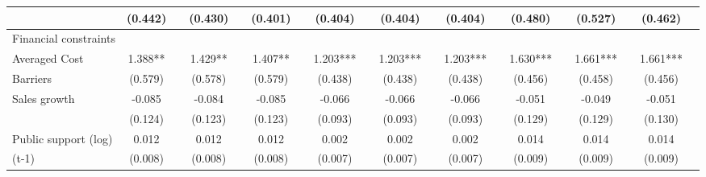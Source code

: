 \begin{table}[htbp]
\begin{tabular}{l*{18}{c}}
                    &     (0.442)   &               &     (0.430)   &               &     (0.401)   &               &     (0.404)   &               &     (0.404)   &               &     (0.404)   &               &     (0.480)   &               &     (0.527)   &               &     (0.462)   &               \\
\hline
Financial constraints&               &               &               &               &               &               &               &               &               &               &               &               &               &               &               &               &               &               \\
Averaged Cost       &       1.388** &               &       1.429** &               &       1.407** &               &       1.203***&               &       1.203***&               &       1.203***&               &       1.630***&               &       1.661***&               &       1.661***&               \\
Barriers            &     (0.579)   &               &     (0.578)   &               &     (0.579)   &               &     (0.438)   &               &     (0.438)   &               &     (0.438)   &               &     (0.456)   &               &     (0.458)   &               &     (0.456)   &               \\
Sales growth        &      -0.085   &               &      -0.084   &               &      -0.085   &               &      -0.066   &               &      -0.066   &               &      -0.066   &               &      -0.051   &               &      -0.049   &               &      -0.051   &               \\
                    &     (0.124)   &               &     (0.123)   &               &     (0.123)   &               &     (0.093)   &               &     (0.093)   &               &     (0.093)   &               &     (0.129)   &               &     (0.129)   &               &     (0.130)   &               \\
Public support (log)&       0.012   &               &       0.012   &               &       0.012   &               &       0.002   &               &       0.002   &               &       0.002   &               &       0.014   &               &       0.014   &               &       0.014   &               \\
(t-1)               &     (0.008)   &               &     (0.008)   &               &     (0.008)   &               &     (0.007)   &               &     (0.007)   &               &     (0.007)   &               &     (0.009)   &               &     (0.009)   &               &     (0.009)   &               \\

\end{tabular}
\end{table}
